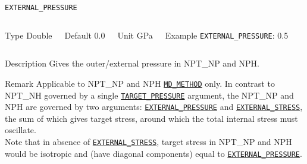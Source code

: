 \begin{frame}[allowframebreaks]{\texttt{EXTERNAL\_PRESSURE}} \label{EXTERNAL_PRESSURE}
\vspace*{-12pt}
\begin{columns}
\begin{block}{Type}
Double
\end{block}

\begin{block}{Default}
0.0
\end{block}

\begin{block}{Unit}
GPa
\end{block}

\begin{block}{Example}
\texttt{EXTERNAL\_PRESSURE}: 0.5
\end{block}
\end{columns}

\begin{block}{Description}
Gives the outer/external pressure in NPT\_NP and NPH.
\end{block}

\begin{block}{Remark}
Applicable to NPT\_NP and NPH \hyperlink{MD_METHOD}{\texttt{MD\_METHOD}} only. In contrast to NPT\_NH governed by a single \hyperlink{TARGET\_PRESSURE}{\texttt{TARGET\_PRESSURE}} argument, the NPT\_NP and NPH are governed by two arguments: \hyperlink{EXTERNAL\_PRESSURE}{\texttt{EXTERNAL\_PRESSURE}} and \hyperlink{EXTERNAL\_STRESS}{\texttt{EXTERNAL\_STRESS}}, the sum of which gives target stress, around which the total internal stress must oscillate.  
\\
Note that in absence of \hyperlink{EXTERNAL_STRESS}{\texttt{EXTERNAL\_STRESS}}, target stress in NPT\_NP and NPH would be isotropic and (have diagonal components) equal to \hyperlink{EXTERNAL\_PRESSURE}{\texttt{EXTERNAL\_PRESSURE}}. 


\end{block}

\end{frame}



